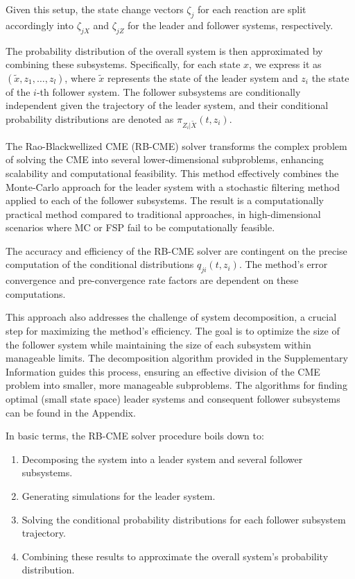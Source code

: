 \documentclass[11pt]{isr} %
\begin{document}
Given this setup, the state change vectors $\zeta_j$ for each reaction are split accordingly into $\zeta_{jX}^{\tilde{}}$ and $\zeta_{jZ}^{\tilde{}}$ for the leader and follower systems, respectively.

The probability distribution of the overall system is then approximated by combining these subsystems. Specifically, for each state $x$, we express it as $(\tilde{x}, z_1, \ldots, z_l)$, where $\tilde{x}$ represents the state of the leader system and $z_i$ the state of the $i$-th follower system. The follower subsystems are conditionally independent given the trajectory of the leader system, and their conditional probability distributions are denoted as $\pi_{Z_i|\tilde{X}}(t, z_i)$. \cite{hasenauer}

The Rao-Blackwellized CME (RB-CME) solver transforms the complex problem of solving the CME into several lower-dimensional subproblems, enhancing scalability and computational feasibility. This method effectively combines the Monte-Carlo approach for the leader system with a stochastic filtering method \cite{bain} applied to each of the follower subsystems. The result is a computationally practical method compared to traditional approaches, in high-dimensional scenarios where MC or FSP fail to be computationally feasible.

The accuracy and efficiency of the RB-CME solver are contingent on the precise computation of the conditional distributions $q_{ji}(t, z_i)$. The method's error convergence and pre-convergence rate factors are dependent on these computations.

This approach also addresses the challenge of system decomposition, a crucial step for maximizing the method's efficiency. The goal is to optimize the size of the follower system while maintaining the size of each subsystem within manageable limits. The decomposition algorithm provided in the Supplementary Information guides this process, ensuring an effective division of the CME problem into smaller, more manageable subproblems. The algorithms for finding optimal (small state space) leader systems and consequent follower subsystems can be found in the Appendix.

In basic terms, the RB-CME solver procedure boils down to:
\begin{enumerate}
    \item Decomposing the system into a leader system and several follower subsystems.
    \item Generating simulations for the leader system.
    \item Solving the conditional probability distributions for each follower subsystem trajectory.
    \item Combining these results to approximate the overall system's probability distribution.
\end{enumerate}
\end{document}
